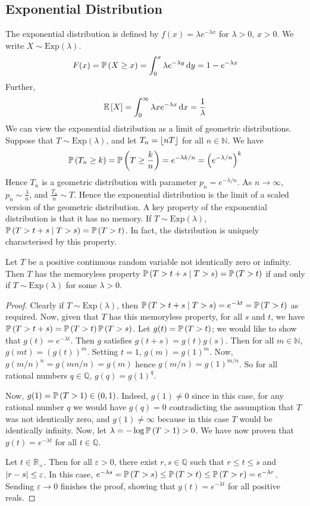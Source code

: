 \subsection{Exponential Distribution}
The exponential distribution is defined by \(f(x) = \lambda e^{-\lambda x}\) for \(\lambda > 0\), \(x > 0\).
We write \(X \sim \mathrm{Exp}(\lambda)\).
\[
	F(x) = \mathbb{P}\left({X \geq x}\right) = \int_0^x \lambda e^{-\lambda y} \dd{y} = 1 - e^{-\lambda x}
\]
Further,
\[
	\mathbb{E}\left[{X}\right] = \int_0^\infty \lambda x e^{-\lambda x} \dd{x} = \frac{1}{\lambda}
\]
We can view the exponential distribution as a limit of geometric distributions.
Suppose that \(T \sim \mathrm{Exp}(\lambda)\), and let \(T_n = \lfloor nT\rfloor\) for all \(n \in \mathbb N\).
We have
\[
	\mathbb{P}\left({T_n \geq k}\right) = \mathbb{P}\left({T \geq \frac{k}{n}}\right) = e^{-\lambda k / n} = \left( e^{-\lambda/n} \right)^k
\]
Hence \(T_n\) is a geometric distribution with parameter \(p_n = e^{-\lambda/n}\).
As \(n \to \infty\), \(p_n \sim \frac{\lambda}{n}\), and \(\frac{T_n}{n} \sim T\).
Hence the exponential distribution is the limit of a scaled version of the geometric distribution.
A key property of the exponential distribution is that it has no memory.
If \(T \sim \mathrm{Exp}(\lambda)\), \(\mathbb{P}\left({T > t + s \mid T > s}\right) = \mathbb{P}\left({T > t}\right)\).
In fact, the distribution is uniquely characterised by this property.
\begin{proposition}
	Let \(T\) be a positive continuous random variable not identically zero or infinity.
	Then \(T\) has the memoryless property \(\mathbb{P}\left({T > t + s \mid T > s}\right) = \mathbb{P}\left({T > t}\right)\) if and only if \(T \sim \mathrm{Exp}(\lambda)\) for some \(\lambda > 0\).
\end{proposition}
\begin{proof}
	Clearly if \(T \sim \mathrm{Exp}(\lambda)\), then \(\mathbb{P}\left({T > t + s \mid T > s}\right) = e^{-\lambda t} = \mathbb{P}\left({T > t}\right)\) as required.
	Now, given that \(T\) has this memoryless property, for all \(s\) and \(t\), we have \(\mathbb{P}\left({T > t + s}\right) = \mathbb{P}\left({T > t}\right) \mathbb{P}\left({T > s}\right)\).
	Let \(g(t) = \mathbb{P}\left({T > t}\right)\); we would like to show that \(g(t) = e^{-\lambda t}\).
	Then \(g\) satisfies \(g(t+s) = g(t)g(s)\).
	Then for all \(m \in \mathbb N\), \(g(mt) = (g(t))^m\).
	Setting \(t=1\), \(g(m) = g(1)^m\).
	Now, \(g(m/n)^n = g(mn/n) = g(m)\) hence \(g(m/n) = g(1)^{m/n}\).
	So for all rational numbers \(q \in \mathbb Q\), \(g(q) = g(1)^q\).
	
	Now, \(g(1) = \mathbb{P}\left({T > 1}\right) \in (0, 1)\).
	Indeed, \(g(1) \neq 0\) since in this case, for any rational number \(q\) we would have \(g(q) = 0\) contradicting the assumption that \(T\) was not identically zero, and \(g(1) \neq \infty\) because in this case \(T\) would be identically infinity.
	Now, let \(\lambda = -\log\mathbb{P}\left({T > 1}\right) > 0\).
	We have now proven that \(g(t) = e^{-\lambda t}\) for all \(t\in\mathbb Q\).
	
	Let \(t \in \mathbb R_+\).
	Then for all \(\varepsilon > 0\), there exist \(r, s \in \mathbb Q\) such that \(r \leq t \leq s\) and \(\abs{r - s} \leq \varepsilon\).
	In this case, \(e^{-\lambda s} = \mathbb{P}\left({T > s}\right) \leq \mathbb{P}\left({T > t}\right) \leq \mathbb{P}\left({T > r}\right) = e^{-\lambda r}\).
	Sending \(\varepsilon \to 0\) finishes the proof, showing that \(g(t) = e^{-\lambda t}\) for all positive reals.
\end{proof}

